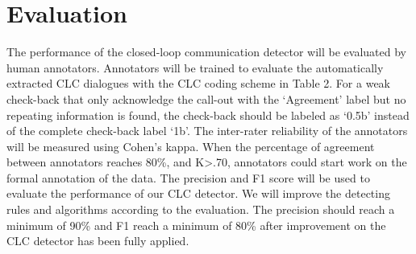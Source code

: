 \section{Evaluation}

The performance of the closed-loop communication detector will be evaluated by
human annotators. Annotators will be trained to evaluate the automatically
extracted CLC dialogues with the CLC coding scheme in Table 2. For a weak
check-back that only acknowledge the call-out with the ‘Agreement’ label but no
repeating information is found, the check-back should be labeled as ‘0.5b’
instead of the complete check-back label ‘1b’.  The inter-rater reliability of
the annotators will be measured using Cohen’s kappa. When the percentage of
agreement between annotators reaches 80\%, and K>.70, annotators could start
work on the formal annotation of the data. The precision and F1 score will be
used to evaluate the performance of our CLC detector. We will improve the
detecting rules and algorithms according to the evaluation. The precision
should reach a minimum of 90\% and F1 reach a minimum of 80\% after improvement
on the CLC detector has been fully applied.

